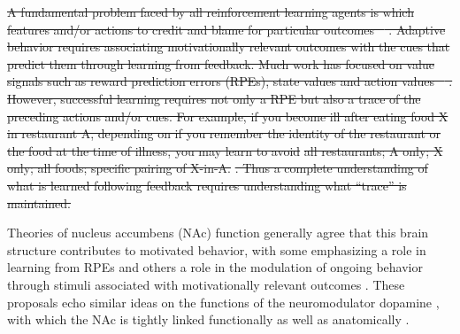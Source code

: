 \documentclass[11pt]{article}
\let\cite=\citep
\providecommand{\DIFdel}[1]{{\protect\color{red}\sout{#1}}}                      %
\providecommand{\DIFdelbegin}{} %
\providecommand{\DIFdelend}{} %
\newcommand{\DIFscaledelfig}{0.5}
\newlength{\DIFdelgraphicswidth} %
\newlength{\DIFdelgraphicsheight} %
\newcommand{\DIFdelincludegraphics}[2][]{%
\sbox{\DIFdelgraphicsbox}{\DIFOincludegraphics[#1]{#2}}%
\settoboxwidth{\DIFdelgraphicswidth}{\DIFdelgraphicsbox} %
\settoboxtotalheight{\DIFdelgraphicsheight}{\DIFdelgraphicsbox} %
\scalebox{\DIFscaledelfig}{%
\parbox[b]{\DIFdelgraphicswidth}{\usebox{\DIFdelgraphicsbox}\\[-\baselineskip] \rule{\DIFdelgraphicswidth}{0em}}\llap{\resizebox{\DIFdelgraphicswidth}{\DIFdelgraphicsheight}{%
\setlength{\unitlength}{\DIFdelgraphicswidth}%
\begin{picture}(1,1)%
\thicklines\linethickness{2pt} %
{\color[rgb]{1,0,0}\put(0,0){\framebox(1,1){}}}%
{\color[rgb]{1,0,0}\put(0,0){\line( 1,1){1}}}%
{\color[rgb]{1,0,0}\put(0,1){\line(1,-1){1}}}%
\end{picture}%
}\hspace*{3pt}}} %
} %
\DeclareRobustCommand{\DIFdelbegin}{\DIFOdelbegin \let\includegraphics\DIFdelincludegraphics} %
\DeclareRobustCommand{\DIFdelend}{\DIFOaddend \let\includegraphics\DIFOincludegraphics} %
\begin{document}
\DIFdelbegin \DIFdel{A fundamental problem faced by all reinforcement learning agents is which features and/or actions to credit and blame for particular outcomes \mbox{%
\cite{sutton1998}}\hspace{0pt}%
. Adaptive behavior requires associating motivationally relevant outcomes with the cues that predict them through learning from feedback. Much work has focused on value signals such as reward prediction errors (RPEs), state values and action values \mbox{%
\cite{Lee2012,Maia2009}}\hspace{0pt}%
. However, successful learning requires not only a RPE but also a trace of the preceding actions and/or cues. For example, if you become ill after eating food X in restaurant A, depending on if you remember the identity of the restaurant or the food at the time of illness, you may learn to avoid }%
\DIFdel{all restaurants; A only; X only; all foods; specific pairing of X-in-A.}%
\DIFdel{. Thus a complete understanding of what is learned following feedback requires understanding what “trace” is maintained.
}%

\DIFdelend Theories of nucleus accumbens (NAc) function generally agree that this
brain structure contributes to motivated behavior, with some
emphasizing a role in learning from RPEs
\cite{Averbeck2017,Joel2002,Khamassi2012,Lee2012,Maia2009,Schultz2016}\cite[see
  also the addiction literature on effects of drug
  rewards;][]{Carelli2009,Hyman2006,Kalivas2005} and others a role in
the modulation of ongoing behavior through stimuli associated with
motivationally relevant outcomes \cite[invigorating,
  directing;][]{Floresco2015,Nicola2010a,Salamone2012}. These
proposals echo similar ideas on the functions of the neuromodulator
dopamine \cite{Berridge2012,Maia2009,Salamone2012,Schultz2016}, with
which the NAc is tightly linked functionally as well as anatomically
\cite{Cheer2007,DuHoffmann2014,Ikemoto2007,Takahashi2016}.
\end{document}
